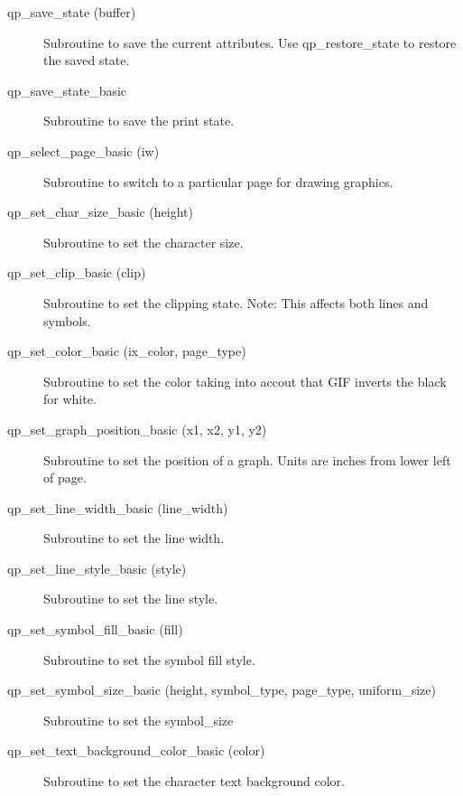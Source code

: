 \begin{description}
\item[qp_save_state (buffer)] \Newline 
     Subroutine to save the current attributes. 
     Use qp_restore_state to restore the saved state.

\item[qp_save_state_basic ] \Newline 
Subroutine to save the print state.

\item[qp_select_page_basic (iw)] \Newline 
Subroutine to switch to a particular page for drawing graphics.

\item[qp_set_char_size_basic (height)] \Newline 
Subroutine to set the character size.

\item[qp_set_clip_basic (clip)] \Newline 
Subroutine to set the clipping state.
Note: This affects both lines and symbols.

\item[qp_set_color_basic (ix_color, page_type)  ] \Newline 
Subroutine to set the color taking into accout that GIF
inverts the black for white.

\item[qp_set_graph_position_basic (x1, x2, y1, y2)] \Newline 
Subroutine to set the position of a graph.
Units are inches from lower left of page.

\item[qp_set_line_width_basic (line_width)] \Newline 
Subroutine to set the line width.

\item[qp_set_line_style_basic (style)] \Newline 
Subroutine to set the line style.

\item[qp_set_symbol_fill_basic (fill)] \Newline 
Subroutine to set the symbol fill style.

\item[qp_set_symbol_size_basic (height, symbol_type, page_type, uniform_size)] \Newline 
Subroutine to set the symbol_size

\item[qp_set_text_background_color_basic (color)] \Newline 
Subroutine to set the character text background color.


\end{description}
